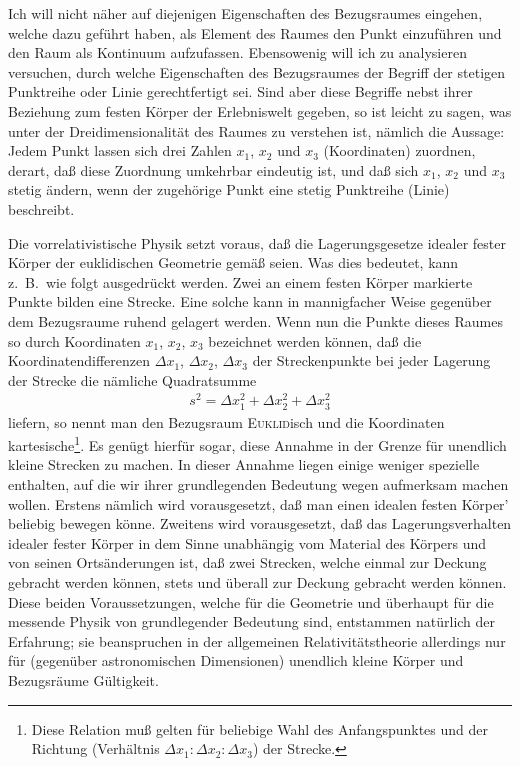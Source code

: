 Ich will nicht näher auf diejenigen Eigenschaften des Bezugsraumes eingehen, 
welche dazu geführt haben, als Element des Raumes den Punkt einzuführen und den 
Raum als Kontinuum aufzufassen. Ebensowenig will ich zu analysieren versuchen, 
durch welche Eigenschaften des Bezugsraumes der Begriff der stetigen Punktreihe 
oder Linie gerechtfertigt sei. Sind aber diese Begriffe nebst ihrer Beziehung 
zum festen Körper der Erlebniswelt gegeben, so ist leicht zu sagen, was unter 
der Dreidimensionalität des Raumes zu verstehen ist, nämlich die Aussage: Jedem 
Punkt lassen sich drei Zahlen $x_1$, $x_2$ und $x_3$ (Koordinaten) zuordnen, 
derart, daß diese Zuordnung umkehrbar eindeutig ist, und daß sich $x_1$, $x_2$ 
und $x_3$ stetig ändern, wenn der zugehörige Punkt eine stetig Punktreihe 
(Linie) beschreibt.

Die vorrelativistische Physik setzt voraus, daß die Lagerungsgesetze idealer 
fester Körper der euklidischen Geometrie gemäß seien. Was dies bedeutet, kann 
z.\ B.\ wie folgt ausgedrückt werden. Zwei an einem festen Körper markierte 
Punkte bilden eine Strecke. Eine solche kann in mannigfacher Weise gegenüber dem 
Bezugsraume ruhend gelagert werden. Wenn nun die Punkte dieses Raumes so durch 
Koordinaten $x_1$, $x_2$, $x_3$ bezeichnet werden können, daß die 
Koordinatendifferenzen $\Delta x_1$, $\Delta x_2$, $\Delta x_3$ der 
Streckenpunkte bei jeder Lagerung der Strecke die nämliche Quadratsumme
\begin{align}
    s^2 = \Delta x_1^2 + \Delta x_2^2 + \Delta x_3^2
\end{align}
liefern, so nennt man den Bezugsraum \textsc{Euklid}isch und die Koordinaten 
kartesische\footnote{Diese Relation muß gelten für beliebige Wahl des 
Anfangspunktes und der Richtung (Verhältnis $\Delta x_1 : \Delta x_2 : \Delta 
x_3$) der Strecke.}. Es genügt hierfür sogar, diese Annahme in der Grenze für 
unendlich kleine Strecken zu machen. In dieser Annahme liegen einige weniger 
spezielle enthalten, auf die wir ihrer grundlegenden Bedeutung wegen aufmerksam 
machen wollen. Erstens nämlich wird vorausgesetzt, daß man einen idealen festen 
Körper' beliebig bewegen könne. Zweitens wird vorausgesetzt, daß das 
Lagerungsverhalten idealer fester Körper in dem Sinne unabhängig vom Material 
des Körpers und von seinen Ortsänderungen ist, daß zwei Strecken, welche einmal 
zur Deckung gebracht werden können, stets und überall zur Deckung gebracht 
werden können. Diese beiden Voraussetzungen, welche für die Geometrie und 
überhaupt für die messende Physik von grundlegender Bedeutung sind, entstammen 
natürlich der Erfahrung; sie beanspruchen in der allgemeinen Relativitätstheorie 
allerdings nur für (gegenüber astronomischen Dimensionen) unendlich kleine 
Körper und Bezugsräume Gültigkeit.

